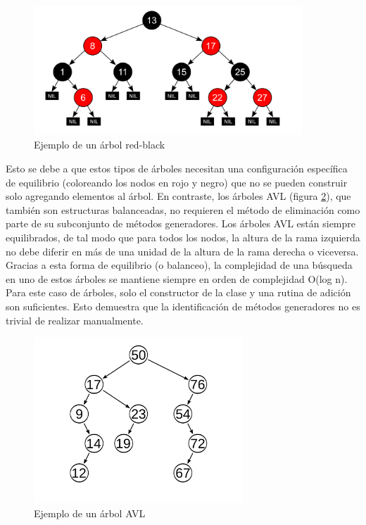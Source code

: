 \begin{figure}
  \centering
  \includegraphics[width=0.9\textwidth]{images/redBlackTree.jpg}
  \caption{Ejemplo de un árbol red-black}
  \label{fig:redBlack1}
\end{figure}

Esto se debe a que estos tipos de árboles necesitan una configuración específica de equilibrio (coloreando los nodos en rojo y negro) que no se pueden construir solo agregando elementos al árbol. En contraste, los árboles AVL (figura \ref{fig:avl}), que también son estructuras balanceadas, no requieren el método de eliminación como parte de su subconjunto de métodos generadores.
Los árboles AVL están siempre equilibrados, de tal modo que para todos los nodos, la altura de la rama izquierda no debe diferir en más de una unidad de la altura de la rama derecha o viceversa. Gracias a esta forma de equilibrio (o balanceo), la complejidad de una búsqueda en uno de estos árboles se mantiene siempre en orden de complejidad O(log n). 
Para este caso de árboles, solo el constructor de la clase y una rutina de adición son suficientes. Esto demuestra que la identificación de métodos generadores no es trivial de realizar manualmente.



\begin{figure}
  \centering
  \includegraphics[width=0.7\textwidth]{images/avl.jpg}
  \caption{Ejemplo de un árbol AVL}
  \label{fig:avl}
\end{figure}


